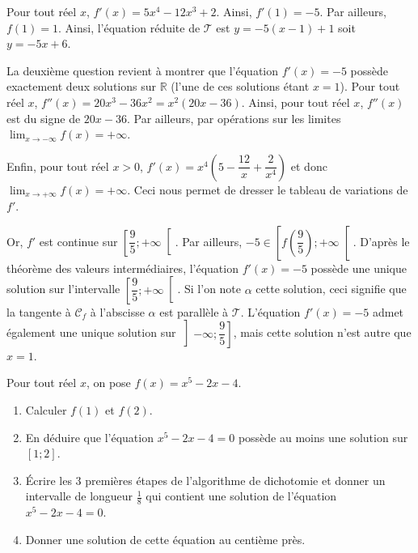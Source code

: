 \documentclass[11pt,fleqn, openany]{book} %
\begin{document}
\begin{solution}Pour tout réel $x$, $f'(x)=5x^4-12x^3+2$. Ainsi, $f'(1)=-5$. Par ailleurs, $f(1)=1$. Ainsi, l'équation réduite de $\mathcal{T}$ est $y=-5(x-1)+1$ soit $y=-5x+6$.

La deuxième question revient à montrer que l'équation $f'(x)=-5$ possède exactement deux solutions sur $\mathbb{R}$ (l'une de ces solutions étant $x=1$). Pour tout réel $x$, $f''(x)=20x^3-36x^2=x^2(20x-36)$. Ainsi, pour tout réel $x$, $f''(x)$ est du signe de $20x-36$. Par ailleurs, par opérations sur les limites $\displaystyle\lim_{x \to -\infty}f(x)=+\infty$. 

Enfin, pour tout réel $x>0$, $f'(x)=x^4\left(5-\dfrac{12}{x}+\dfrac{2}{x^4}\right)$ et donc$\displaystyle\lim_{x \to +\infty}f(x)=+\infty$. Ceci nous permet de dresser le tableau de variations de $f'$.

\begin{center}
\end{center}

Or, $f'$ est continue sur $\left[ \dfrac{9}{5} ; +\infty\right[$. Par ailleurs, $-5 \in \left[ f\left(\dfrac{9}{5}\right) ; +\infty\right[$. D'après le théorème des valeurs intermédiaires, l'équation $f'(x)=-5$ possède une unique solution sur l'intervalle $\left[ \dfrac{9}{5} ; +\infty \right[$. Si l'on note $\alpha$ cette solution, ceci signifie que la tangente à $\mathcal{C}_f$ à l'abscisse $\alpha$ est parallèle à $\mathcal{T}$. L'équation $f'(x)=-5$ admet également une unique solution sur $\left] - \infty; \dfrac{9}{5} \right]$, mais cette solution n'est autre que $x=1$.

\end{solution}





\begin{exercise}Pour tout réel $x$, on pose $f(x)=x^5-2x-4$. 
\begin{enumerate}
\item Calculer $f(1)$ et $f(2)$.
\item En déduire que l'équation $x^5-2x-4=0$ possède au moins une solution sur $[1;2]$.
\item Écrire les 3 premières étapes de l'algorithme de dichotomie et donner un intervalle de longueur $\frac{1}{8}$ qui contient une solution de l'équation $x^5-2x-4=0$.
\item Donner une solution de cette équation au centième près.\end{enumerate}\end{exercise}
\end{document}
